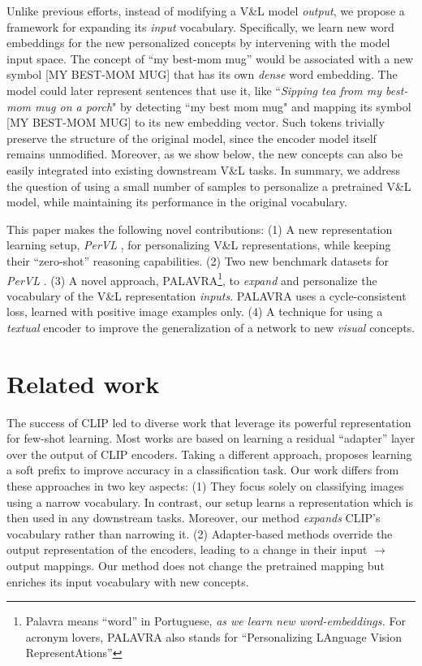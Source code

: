 \documentclass[runningheads]{llncs}
\newcommand{\VL}{V\&L {}}
\newcommand{\PerVL}{PerVL {}}
\begin{document}
Unlike previous efforts, instead of modifying a \VL model \textit{output}, we propose a framework for expanding its \textit{input} vocabulary.  Specifically, we learn new word embeddings for the new personalized concepts by intervening with the model input space. The concept of ``my best-mom mug'' would be associated with a new symbol [MY BEST-MOM MUG] that has its own \textit{dense} word embedding. The model could later represent sentences that use it, like ``\textit{Sipping tea from my best-mom mug on a porch}" by detecting ``my best mom mug" and mapping its symbol [MY BEST-MOM MUG] to its new embedding vector. Such tokens trivially preserve the structure of the original model, since the encoder model itself remains unmodified. Moreover, as we show below, the new concepts can also be easily integrated into existing downstream \VL tasks. In summary, we address the question of using a small number of samples to personalize a pretrained \VL model, while maintaining its performance in the original vocabulary.

This paper makes the following novel contributions: (1) A new
representation learning setup, \textit{\PerVL}\!\!, for personalizing  \VL representations, while keeping their ``zero-shot'' reasoning capabilities. (2) Two new benchmark datasets for \textit{\PerVL\!\!}.
(3) A novel approach, PALAVRA\footnote[7]{Palavra means ``word'' in Portuguese, \textit{as we learn new word-embeddings.} For acronym lovers, PALAVRA also stands for ``Personalizing LAnguage Vision RepresentAtions''},
to \textit{expand} and personalize the vocabulary of the \VL representation \textit{inputs}. PALAVRA uses a cycle-consistent loss,  learned with  positive image examples only.
(4) A technique for using a \textit{textual} encoder to improve the generalization of a network to new \textit{visual} concepts.

\section{Related work}
The success of CLIP led to diverse work that leverage its powerful representation for few-shot learning. Most works \cite{skantze2021collie,zhang2021tip,gao2021clip,ma2021simple} are based on learning a residual ``adapter'' layer \cite{houlsby2019parameter} over the output of CLIP encoders. Taking a different approach, \cite{zhou2021learning} proposes learning a soft prefix to improve accuracy in a classification task. Our work differs from these approaches in two key aspects:
(1) They focus solely on classifying images using a narrow vocabulary.
In contrast, our setup learns a representation which is then used in any downstream tasks. Moreover, our method \textit{expands} CLIP's vocabulary rather than narrowing it.
(2) Adapter-based methods override the output representation of the encoders, leading to a change in their input $\rightarrow$ output mappings. Our method does not change the pretrained mapping but enriches its input vocabulary with new concepts.
\end{document}
